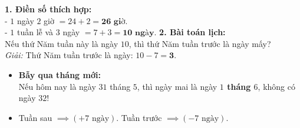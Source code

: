 \documentclass[11pt,a4paper]{article}
\begin{document}
\vspace{-1.5mm}
\noindent
\begin{minipage}[t]{0.49\textwidth}\vspace{0pt}
\begin{tcolorbox}[
  enhanced,
  colback=green!4!white,
  colframe=green!60!black,
  arc=2mm, boxrule=0.8pt,
  left=2mm, right=2mm, top=1.8mm, bottom=1.8mm,
  title={\footnotesize\bfseries\color{white}\faCheckCircle\ 4. Ví dụ thực hành chuẩn mực}
]
{\footnotesize
\textbf{1. Điền số thích hợp:}\\
- $1$ ngày $2$ giờ $= 24 + 2 = \mathbf{26\text{ giờ}}$.\\
- $1$ tuần lễ và $3$ ngày $= 7 + 3 = \mathbf{10\text{ ngày}}$.
\textbf{2. Bài toán lịch:}\\
Nếu thứ Năm tuần này là ngày $10$, thì thứ Năm tuần trước là ngày mấy?\\
\textit{Giải:} Thứ Năm tuần trước là ngày: $10 - 7 = \mathbf{3}$.
}
\end{tcolorbox}
\end{minipage}
\hfill
\begin{minipage}[t]{0.49\textwidth}\vspace{0pt}
\begin{tcolorbox}[
  enhanced,
  colback=red!4!white,
  colframe=red!75!black,
  arc=2mm, boxrule=0.8pt,
  left=2mm, right=2mm, top=1.8mm, bottom=1.8mm,
  title={\footnotesize\bfseries\color{white}\faExclamationTriangle\ 5. Mẹo tránh bẫy trắc nghiệm}
]
{\footnotesize
\begin{itemize}\setlength{\itemsep}{1pt}\setlength{\leftskip}{-2.5mm}
  \item \textbf{Bẫy qua tháng mới:}\\
  Nếu hôm nay là ngày $31$ tháng $5$, thì ngày mai là ngày \textbf{$1$ tháng $6$}, không có ngày $32$!
  \item Tuần sau $\implies (+7\text{ ngày})$. Tuần trước $\implies (-7\text{ ngày})$.
\end{itemize}
}
\end{tcolorbox}
\end{minipage}
\end{document}
